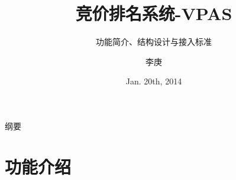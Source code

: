 \documentclass{beamer}
\begin{document}
\begin{CJK}{UTF8}{gbsn}

\title{竞价排名系统-VPAS}

\subtitle{功能简介、结构设计与接入标准}

\author{李庚}


\date{Jan. 20th, 2014}

\subject{2014技术分享}





\begin{frame}
  \titlepage
\end{frame}

\begin{frame}{纲要}
  \tableofcontents
\end{frame}

\section{功能介绍}


\end{CJK}
\end{document}
